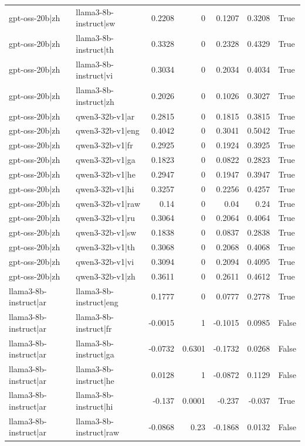 \begin{table}
\begin{tabular}{l l r r r r l}
gpt-oss-20b|zh & llama3-8b-instruct|sw & 0.2208 & 0 & 0.1207 & 0.3208 & True \\
gpt-oss-20b|zh & llama3-8b-instruct|th & 0.3328 & 0 & 0.2328 & 0.4329 & True \\
gpt-oss-20b|zh & llama3-8b-instruct|vi & 0.3034 & 0 & 0.2034 & 0.4034 & True \\
gpt-oss-20b|zh & llama3-8b-instruct|zh & 0.2026 & 0 & 0.1026 & 0.3027 & True \\
gpt-oss-20b|zh & qwen3-32b-v1|ar & 0.2815 & 0 & 0.1815 & 0.3815 & True \\
gpt-oss-20b|zh & qwen3-32b-v1|eng & 0.4042 & 0 & 0.3041 & 0.5042 & True \\
gpt-oss-20b|zh & qwen3-32b-v1|fr & 0.2925 & 0 & 0.1924 & 0.3925 & True \\
gpt-oss-20b|zh & qwen3-32b-v1|ga & 0.1823 & 0 & 0.0822 & 0.2823 & True \\
gpt-oss-20b|zh & qwen3-32b-v1|he & 0.2947 & 0 & 0.1947 & 0.3947 & True \\
gpt-oss-20b|zh & qwen3-32b-v1|hi & 0.3257 & 0 & 0.2256 & 0.4257 & True \\
gpt-oss-20b|zh & qwen3-32b-v1|raw & 0.14 & 0 & 0.04 & 0.24 & True \\
gpt-oss-20b|zh & qwen3-32b-v1|ru & 0.3064 & 0 & 0.2064 & 0.4064 & True \\
gpt-oss-20b|zh & qwen3-32b-v1|sw & 0.1838 & 0 & 0.0837 & 0.2838 & True \\
gpt-oss-20b|zh & qwen3-32b-v1|th & 0.3068 & 0 & 0.2068 & 0.4068 & True \\
gpt-oss-20b|zh & qwen3-32b-v1|vi & 0.3094 & 0 & 0.2094 & 0.4095 & True \\
gpt-oss-20b|zh & qwen3-32b-v1|zh & 0.3611 & 0 & 0.2611 & 0.4612 & True \\
llama3-8b-instruct|ar & llama3-8b-instruct|eng & 0.1777 & 0 & 0.0777 & 0.2778 & True \\
llama3-8b-instruct|ar & llama3-8b-instruct|fr & -0.0015 & 1 & -0.1015 & 0.0985 & False \\
llama3-8b-instruct|ar & llama3-8b-instruct|ga & -0.0732 & 0.6301 & -0.1732 & 0.0268 & False \\
llama3-8b-instruct|ar & llama3-8b-instruct|he & 0.0128 & 1 & -0.0872 & 0.1129 & False \\
llama3-8b-instruct|ar & llama3-8b-instruct|hi & -0.137 & 0.0001 & -0.237 & -0.037 & True \\
llama3-8b-instruct|ar & llama3-8b-instruct|raw & -0.0868 & 0.23 & -0.1868 & 0.0132 & False \\

\end{tabular}
\end{table}
